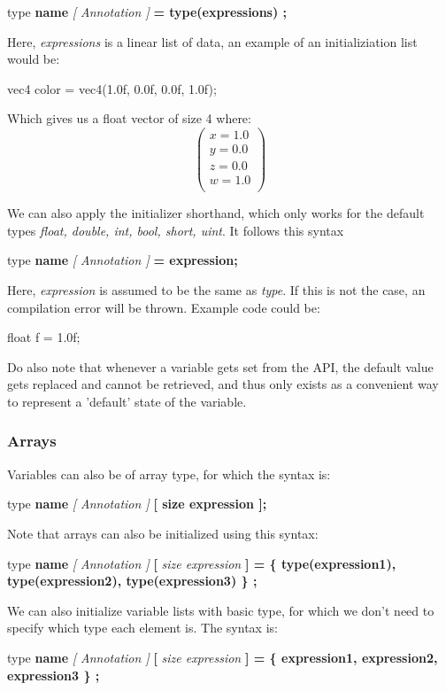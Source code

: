\documentclass{article}
\newcommand{\SyntaxBox}[1]
{	
	\begin{center}
	\colorbox{orange!60}
	{
		\begin{minipage}{\linewidth}
		\hfill
		\begin{tabbing}
		#1
		\end{tabbing}
		\end{minipage}
	}
	\end{center}
}
\begin{document}
\SyntaxBox
{
	type \textbf{name} \textit{[ Annotation ]} \textbf{= type(expressions) ;}
}

Here, \textit{expressions} is a linear list of data, an example of an initializiation list would be:

\begin{CodeBox}
	vec4 color = vec4(1.0f, 0.0f, 0.0f, 1.0f);
\end{CodeBox}

Which gives us a float vector of size 4 where:
\[
	\left(
	\begin{array}{c}
	x = 1.0 \\
	y = 0.0 \\ 
	z = 0.0 \\
	w = 1.0 \\
	\end{array}
	\right)
\]

We can also apply the initializer shorthand, which only works for the default types \textit{float, double, int, bool, short, uint}. It follows this syntax

\SyntaxBox
{
	type \textbf{name} \textit{[ Annotation ]} \textbf{= expression;}
}

Here, \textit{expression} is assumed to be the same as \textit{type}. If this is not the case, an compilation error will be thrown. Example code could be:

\begin{CodeBox}
	float f = 1.0f;
\end{CodeBox}


Do also note that whenever a variable gets set from the API, the default value gets replaced and cannot be retrieved, and thus only exists as a convenient way to represent a 'default' state of the variable.

\subsubsection{Arrays}
Variables can also be of array type, for which the syntax is:

\SyntaxBox
{
	type \textbf{name} \textit{[ Annotation ]} \textbf{[ size expression ];}
}

Note that arrays can also be initialized using this syntax:

\SyntaxBox
{
	type \textbf{name} \textit{[ Annotation ]} \textbf{[} \textit{size expression} \textbf{] = \{ type(\textbf{expression1}), type(\textbf{expression2}), type(\textbf{expression3}) \} ;}
}

We can also initialize variable lists with basic type, for which we don't need to specify which type each element is. The syntax is:
\SyntaxBox
{
	type \textbf{name} \textit{[ Annotation ]} \textbf{[} \textit{size expression} \textbf{] = \{ \textbf{expression1}, \textbf{expression2}, \textbf{expression3} \} ;}
}
\end{document}
